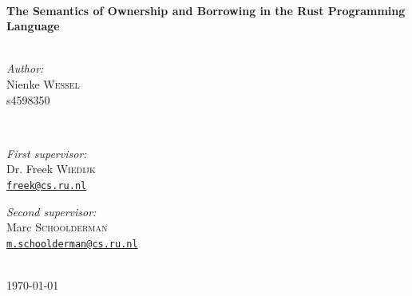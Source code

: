 \documentclass{report}
\begin{document}
\begin{titlepage}
\HRule \\[0.4cm]
{ \huge \bfseries The Semantics of Ownership and Borrowing in the Rust Programming Language}\\[0.4cm] %
\HRule \\[1.5cm]
 

\begin{minipage}[t]{0.4\textwidth}
\begin{flushleft} \large
\emph{Author:}\\
Nienke \textsc{Wessel}\\ %
s4598350
\end{flushleft}
\end{minipage}
~
\begin{minipage}[t]{0.4\textwidth}
\begin{flushright} \large
\emph{First supervisor:} \\
Dr. Freek \textsc{Wiedijk}\\ %
\texttt{\href{mailto:freek@cs.ru.nl}{freek@cs.ru.nl}}
\end{flushright}

\begin{flushright} \large
\emph{Second supervisor:} \\
Marc \textsc{Schoolderman} \\%
\texttt{\href{mailto:m.schoolderman@cs.ru.nl}{m.schoolderman@cs.ru.nl}}
\end{flushright}
\end{minipage}\\[2cm]



{\large \today}\\[2cm] %

\vfill %

\end{titlepage}
\end{document}
